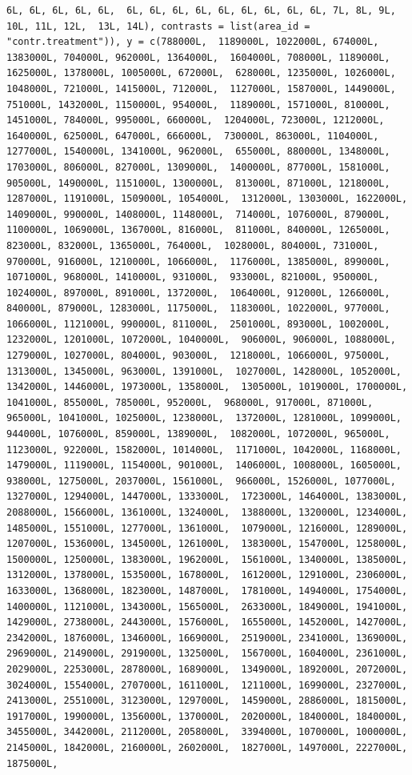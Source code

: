 \documentclass[
]{article}
\begin{document}
\begin{verbatim}
6L, 6L, 6L, 6L, 6L,  6L, 6L, 6L, 6L, 6L, 6L, 6L, 6L, 6L, 7L, 8L, 9L, 10L, 11L, 12L,  13L, 14L), contrasts = list(area_id = "contr.treatment")), y = c(788000L,  1189000L, 1022000L, 674000L, 1383000L, 704000L, 962000L, 1364000L,  1604000L, 708000L, 1189000L, 1625000L, 1378000L, 1005000L, 672000L,  628000L, 1235000L, 1026000L, 1048000L, 721000L, 1415000L, 712000L,  1127000L, 1587000L, 1449000L, 751000L, 1432000L, 1150000L, 954000L,  1189000L, 1571000L, 810000L, 1451000L, 784000L, 995000L, 660000L,  1204000L, 723000L, 1212000L, 1640000L, 625000L, 647000L, 666000L,  730000L, 863000L, 1104000L, 1277000L, 1540000L, 1341000L, 962000L,  655000L, 880000L, 1348000L, 1703000L, 806000L, 827000L, 1309000L,  1400000L, 877000L, 1581000L, 905000L, 1490000L, 1151000L, 1300000L,  813000L, 871000L, 1218000L, 1287000L, 1191000L, 1509000L, 1054000L,  1312000L, 1303000L, 1622000L, 1409000L, 990000L, 1408000L, 1148000L,  714000L, 1076000L, 879000L, 1100000L, 1069000L, 1367000L, 816000L,  811000L, 840000L, 1265000L, 823000L, 832000L, 1365000L, 764000L,  1028000L, 804000L, 731000L, 970000L, 916000L, 1210000L, 1066000L,  1176000L, 1385000L, 899000L, 1071000L, 968000L, 1410000L, 931000L,  933000L, 821000L, 950000L, 1024000L, 897000L, 891000L, 1372000L,  1064000L, 912000L, 1266000L, 840000L, 879000L, 1283000L, 1175000L,  1183000L, 1022000L, 977000L, 1066000L, 1121000L, 990000L, 811000L,  2501000L, 893000L, 1002000L, 1232000L, 1201000L, 1072000L, 1040000L,  906000L, 906000L, 1088000L, 1279000L, 1027000L, 804000L, 903000L,  1218000L, 1066000L, 975000L, 1313000L, 1345000L, 963000L, 1391000L,  1027000L, 1428000L, 1052000L, 1342000L, 1446000L, 1973000L, 1358000L,  1305000L, 1019000L, 1700000L, 1041000L, 855000L, 785000L, 952000L,  968000L, 917000L, 871000L, 965000L, 1041000L, 1025000L, 1238000L,  1372000L, 1281000L, 1099000L, 944000L, 1076000L, 859000L, 1389000L,  1082000L, 1072000L, 965000L, 1123000L, 922000L, 1582000L, 1014000L,  1171000L, 1042000L, 1168000L, 1479000L, 1119000L, 1154000L, 901000L,  1406000L, 1008000L, 1605000L, 938000L, 1275000L, 2037000L, 1561000L,  966000L, 1526000L, 1077000L, 1327000L, 1294000L, 1447000L, 1333000L,  1723000L, 1464000L, 1383000L, 2088000L, 1566000L, 1361000L, 1324000L,  1388000L, 1320000L, 1234000L, 1485000L, 1551000L, 1277000L, 1361000L,  1079000L, 1216000L, 1289000L, 1207000L, 1536000L, 1345000L, 1261000L,  1383000L, 1547000L, 1258000L, 1500000L, 1250000L, 1383000L, 1962000L,  1561000L, 1340000L, 1385000L, 1312000L, 1378000L, 1535000L, 1678000L,  1612000L, 1291000L, 2306000L, 1633000L, 1368000L, 1823000L, 1487000L,  1781000L, 1494000L, 1754000L, 1400000L, 1121000L, 1343000L, 1565000L,  2633000L, 1849000L, 1941000L, 1429000L, 2738000L, 2443000L, 1576000L,  1655000L, 1452000L, 1427000L, 2342000L, 1876000L, 1346000L, 1669000L,  2519000L, 2341000L, 1369000L, 2969000L, 2149000L, 2919000L, 1325000L,  1567000L, 1604000L, 2361000L, 2029000L, 2253000L, 2878000L, 1689000L,  1349000L, 1892000L, 2072000L, 3024000L, 1554000L, 2707000L, 1611000L,  1211000L, 1699000L, 2327000L, 2413000L, 2551000L, 3123000L, 1297000L,  1459000L, 2886000L, 1815000L, 1917000L, 1990000L, 1356000L, 1370000L,  2020000L, 1840000L, 1840000L, 3455000L, 3442000L, 2112000L, 2058000L,  3394000L, 1070000L, 1000000L, 2145000L, 1842000L, 2160000L, 2602000L,  1827000L, 1497000L, 2227000L, 1875000L, 
\end{verbatim}
\end{document}
